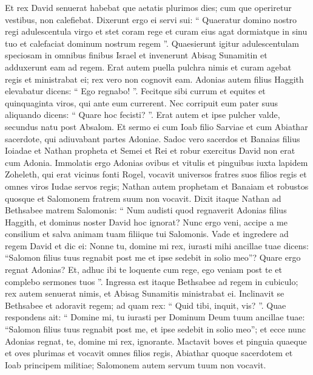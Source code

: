 \begin{biblechapter}
 \verse Et rex David senuerat habebat que aetatis plurimos dies; cum que operiretur vestibus, non calefiebat. 
\verse Dixerunt ergo ei servi sui: “ Quaeratur domino nostro regi adulescentula virgo et stet coram rege et curam eius agat dormiatque in sinu tuo et calefaciat dominum nostrum regem ”. 
\verse Quaesierunt igitur adulescentulam speciosam in omnibus finibus Israel et invenerunt Abisag Sunamitin et adduxerunt eam ad regem. 
\verse Erat autem puella pulchra nimis et curam agebat regis et ministrabat ei; rex vero non cognovit eam.
 \verse Adonias autem filius Haggith elevabatur dicens: “ Ego regnabo! ”. Fecitque sibi currum et equites et quinquaginta viros, qui ante eum currerent. 
\verse Nec corripuit eum pater suus aliquando dicens: “ Quare hoc fecisti? ”. Erat autem et ipse pulcher valde, secundus natu post Absalom. 
\verse Et sermo ei cum Ioab filio Sarviae et cum Abiathar sacerdote, qui adiuvabant partes Adoniae. 
\verse Sadoc vero sacerdos et Banaias filius Ioiadae et Nathan propheta et Semei et Rei et robur exercitus David non erat cum Adonia. 
\verse Immolatis ergo Adonias ovibus et vitulis et pinguibus iuxta lapidem Zoheleth, qui erat vicinus fonti Rogel, vocavit universos fratres suos filios regis et omnes viros Iudae servos regis; 
\verse Nathan autem prophetam et Banaiam et robustos quosque et Salomonem fratrem suum non vocavit.
 \verse Dixit itaque Nathan ad Bethsabee matrem Salomonis: “ Num audisti quod regnaverit Adonias filius Haggith, et dominus noster David hoc ignorat? 
\verse Nunc ergo veni, accipe a me consilium et salva animam tuam filiique tui Salomonis. 
\verse Vade et ingredere ad regem David et dic ei: Nonne tu, domine mi rex, iurasti mihi ancillae tuae dicens: “Salomon filius tuus regnabit post me et ipse sedebit in solio meo”? Quare ergo regnat Adonias? 
\verse Et, adhuc ibi te loquente cum rege, ego veniam post te et complebo sermones tuos ”.
 \verse Ingressa est itaque Bethsabee ad regem in cubiculo; rex autem senuerat nimis, et Abisag Sunamitis ministrabat ei. 
\verse Inclinavit se Bethsabee et adoravit regem; ad quam rex: “ Quid tibi, inquit, vis? ”. 
\verse Quae respondens ait: “ Domine mi, tu iurasti per Dominum Deum tuum ancillae tuae: “Salomon filius tuus regnabit post me, et ipse sedebit in solio meo”; 
\verse et ecce nunc Adonias regnat, te, domine mi rex, ignorante. 
\verse Mactavit boves et pinguia quaeque et oves plurimas et vocavit omnes filios regis, Abiathar quoque sacerdotem et Ioab principem militiae; Salomonem autem servum tuum non vocavit. 

\end{biblechapter}
